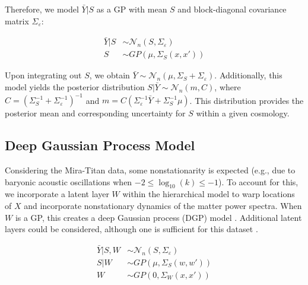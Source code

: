 \documentclass[11pt]{article}
\begin{document}

Therefore, we model $\bar Y|S$ as a GP with mean $S$ and block-diagonal covariance 
matrix $\Sigma_\varepsilon$:

\begin{align}
\bar Y|S &\sim \mathcal{N}_n(S,\Sigma_\varepsilon) \\
S &\sim GP\left(\mu, \Sigma_S(x,x')\right)
\end{align}

Upon integrating out $S$, we obtain $\bar Y \sim \mathcal{N}_n(\mu, \Sigma_S+\Sigma_\varepsilon)$. 
Additionally, this model yields the posterior distribution $S|\bar Y \sim \mathcal{N}_n(m, C)$, 
where $C=\left(\Sigma_S^{-1}+\Sigma_\varepsilon^{-1}\right)^{-1}$ and 
$m=C\left(\Sigma_\varepsilon^{-1}\bar Y+\Sigma_S^{-1}\mu\right)$. 
This distribution provides the posterior mean and corresponding uncertainty for 
$S$ within a given cosmology. 

\subsection{Deep Gaussian Process Model}

Considering the Mira-Titan data, some nonstationarity is expected (e.g., due to 
baryonic acoustic oscillations when $-2 \leq \log_{10}(k) \leq -1$). To account 
for this, we incorporate a latent layer $W$ within the hierarchical model to warp 
locations of $X$ and incorporate nonstationary dynamics of the matter power spectra. 
When $W$ is a GP, this creates a deep Gaussian process (DGP) model \citep{damianou2013deep}. 
Additional latent layers could be considered, although one is sufficient for this 
dataset \citep{dunlop2018deep}.

\begin{align}
\bar Y|S,W &\sim \mathcal{N}_n(S,\Sigma_\varepsilon) \\
S|W &\sim GP\left(\mu, \Sigma_S(w,w')\right) \\
W &\sim GP\left(0, \Sigma_W(x,x')\right)
\end{align}
\end{document}
